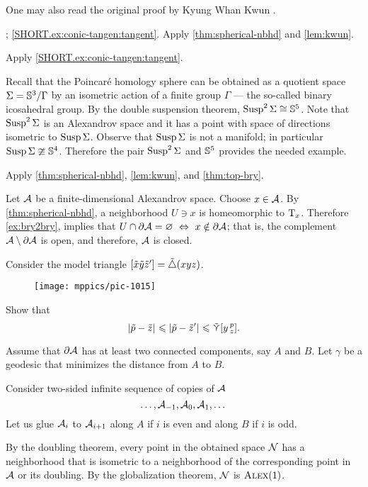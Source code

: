  One may also read the original proof by Kyung Whan Kwun \cite{kwun1964}.

\parbf{\ref{ex:conic-tangent}}; \ref{SHORT.ex:conic-tangen:tangent}. Apply \ref{thm:spherical-nbhd} and \ref{lem:kwun}.

 Apply \ref{SHORT.ex:conic-tangen:tangent}.

 Recall that the Poincaré homology sphere can be obtained as a quotient space $\Sigma=\mathbb{S}^3/\Gamma$ by an isometric action of a finite group $\Gamma$  --- the so-called binary icosahedral group.
By the double suspension theorem,  $\mathop{\rm Susp}\nolimits^2\Sigma\cong\mathbb{S}^5$.
Note that $\mathop{\rm Susp}\nolimits^2\Sigma$ is an Alexandrov space and it has a point with space of directions isometric to $\mathop{\rm Susp}\nolimits\Sigma$.
Observe that $\mathop{\rm Susp}\nolimits\Sigma$ is not a manifold; in particular $\mathop{\rm Susp}\nolimits\Sigma\ncong\mathbb{S}^4$.
Therefore the pair $\mathop{\rm Susp}\nolimits^2\Sigma$ and $\mathbb{S}^5$ provides the needed example.

 Apply \ref{thm:spherical-nbhd}, \ref{lem:kwun}, and \ref{thm:top-bry}.

Let $\mathcal{A}$ be a finite-dimensional Alexandrov space.
Choose $x\in\mathcal{A}$.
By \ref{thm:spherical-nbhd}, a neighborhood $U\ni x$ is homeomorphic to $\mathrm{T}_x$.
Therefore \ref{ex:bry2bry}, implies that $U\cap\partial\spc{A}=\emptyset\  \Leftrightarrow\ x\notin \partial\spc{A}$;
that is, the complement $\mathcal{A}\setminus\partial\mathcal{A}$ is open, and therefore, $\mathcal{A}$ is closed.

Consider the model triangle $[\tilde x\tilde y\tilde z']=\tilde\triangle(xyz)$.
\begin{figure}[ht!]
\vskip-0mm
\centering
\texttt{[image: mppics/pic-1015]}
\end{figure}

Show that 
\[|{\tilde p}-{\tilde z}|_{}^{{}}\leqslant |{\tilde p}-{\tilde z'}|_{}^{{}}\leqslant\mathop{\tilde\curlyvee}\nolimits[y\,{}^{p}_{z}].\]


Assume that $\partial\mathcal{A}$ has at least two connected components, say $A$ and $B$.
Let $\gamma$ be a geodesic that minimizes the distance from $A$ to $B$.

Consider two-sided infinite sequence of copies of $\mathcal{A}$
\[\dots,\mathcal{A}_{-1},\mathcal{A}_{0},\mathcal{A}_{1},\dots\]
Let us glue $\mathcal{A}_{i}$ to $\mathcal{A}_{i+1}$ along $A$ if $i$ is even and along $B$ if $i$ is odd.

By the doubling theorem, every point in the obtained space $\mathcal{N}$ has a neighborhood that is isometric to a neighborhood of the corresponding point in $\mathcal{A}$ or its doubling.
By the globalization theorem, $\mathcal{N}$ is $\textsc{Alex}(1)$.

